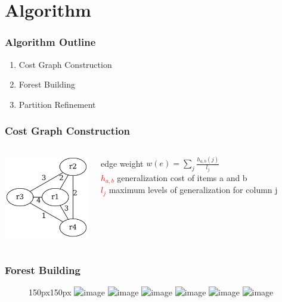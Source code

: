 \section{Algorithm}

\begin{frame}
  \frametitle{Algorithm Outline}
  \begin{enumerate}
    \item Cost Graph Construction
    \item Forest Building
    \item Partition Refinement
  \end{enumerate}
\end{frame}

\begin{frame}
  \frametitle{Cost Graph Construction}
  \begin{columns}
    \includegraphics[width=140px]{../graphs/cost-graph.png}
    \begin{block}{edge weight}
      \(w(e)=\sum_{j}^{} \frac{h_{a,b}(j)}{l_{j}}\) \\
      \scriptsize{
	\textcolor{red}{ \(h_{a,b}\) } generalization cost of items a and b \\
	\textcolor{red}{ \(l_{j}\) } maximum levels of generalization for column j
      }
    \end{block}
  \end{columns}
\end{frame}

\begin{frame}
  \frametitle{Forest Building}
  \begin{center}
    \begin{figure}[ht]
      \begin{overlayarea}{150px}{150px}
	\includegraphics<1>[width=140px]{../graphs/cost-graph-s0.png}
	\includegraphics<2>[width=140px]{../graphs/cost-graph-s1.png}
	\includegraphics<3>[width=140px]{../graphs/cost-graph-s2.png}
	\includegraphics<4>[width=140px]{../graphs/cost-graph-s3.png}
	\includegraphics<5>[width=140px]{../graphs/cost-graph-s4.png}
	\includegraphics<6>[width=140px]{../graphs/cost-graph-s5.png}
      \end{overlayarea}
    \end{figure}
  \end{center}
\end{frame}

